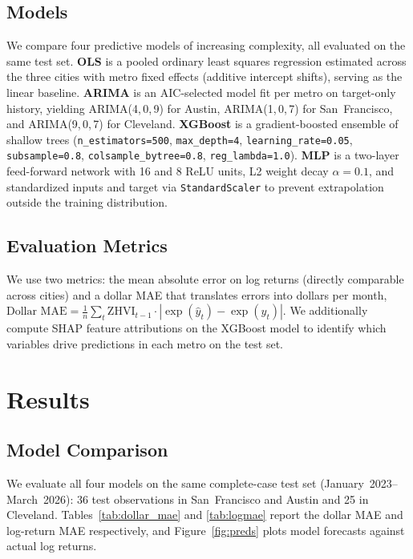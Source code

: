 \documentclass[12pt]{article}
\begin{document}
\subsection{Models}

We compare four predictive models of increasing complexity, all evaluated on the same test set. \textbf{OLS} is a pooled ordinary least squares regression estimated across the three cities with metro fixed effects (additive intercept shifts), serving as the linear baseline. \textbf{ARIMA} is an AIC-selected model fit per metro on target-only history, yielding ARIMA(4,\,0,\,9) for Austin, ARIMA(1,\,0,\,7) for San~Francisco, and ARIMA(9,\,0,\,7) for Cleveland. \textbf{XGBoost} is a gradient-boosted ensemble of shallow trees (\texttt{n\_estimators=500}, \texttt{max\_depth=4}, \texttt{learning\_rate=0.05}, \texttt{subsample=0.8}, \texttt{colsample\_bytree=0.8}, \texttt{reg\_lambda=1.0}). \textbf{MLP} is a two-layer feed-forward network with 16 and 8 ReLU units, L2 weight decay $\alpha=0.1$, and standardized inputs and target via \texttt{StandardScaler} to prevent extrapolation outside the training distribution.

\subsection{Evaluation Metrics}

We use two metrics: the mean absolute error on log returns (directly comparable across cities) and a dollar MAE that translates errors into dollars per month, $\text{Dollar MAE} = \frac{1}{n}\sum_{t} \text{ZHVI}_{t-1} \cdot |\exp(\hat{y}_t) - \exp(y_t)|$. We additionally compute SHAP feature attributions on the XGBoost model to identify which variables drive predictions in each metro on the test set.

\section{Results}
\label{sec:results}

\subsection{Model Comparison}

We evaluate all four models on the same complete-case test set (January~2023--March~2026): 36 test observations in San~Francisco and Austin and 25 in Cleveland. Tables~\ref{tab:dollar_mae} and \ref{tab:logmae} report the dollar MAE and log-return MAE respectively, and Figure~\ref{fig:preds} plots model forecasts against actual log returns.
\end{document}
